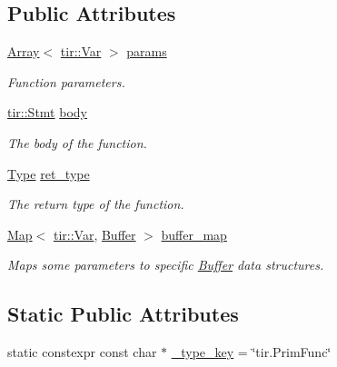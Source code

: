 \subsection*{Public Attributes}
\begin{DoxyCompactItemize}
\item 
\hyperlink{classtvm_1_1Array}{Array}$<$ \hyperlink{classtvm_1_1tir_1_1Var}{tir\+::\+Var} $>$ \hyperlink{classtvm_1_1tir_1_1PrimFuncNode_a4ea77411935e78d975414f31e153fc78}{params}
\begin{DoxyCompactList}\small\item\em Function parameters. \end{DoxyCompactList}\item 
\hyperlink{classtvm_1_1tir_1_1Stmt}{tir\+::\+Stmt} \hyperlink{classtvm_1_1tir_1_1PrimFuncNode_a9fce10a00a4a34c1fa52f7cca25b7e3b}{body}
\begin{DoxyCompactList}\small\item\em The body of the function. \end{DoxyCompactList}\item 
\hyperlink{classtvm_1_1Type}{Type} \hyperlink{classtvm_1_1tir_1_1PrimFuncNode_aa325068615c301abec6656416cab8e09}{ret\+\_\+type}
\begin{DoxyCompactList}\small\item\em The return type of the function. \end{DoxyCompactList}\item 
\hyperlink{classtvm_1_1Map}{Map}$<$ \hyperlink{classtvm_1_1tir_1_1Var}{tir\+::\+Var}, \hyperlink{classtvm_1_1tir_1_1Buffer}{Buffer} $>$ \hyperlink{classtvm_1_1tir_1_1PrimFuncNode_aeb1f162516e09122852496f2a945d100}{buffer\+\_\+map}
\begin{DoxyCompactList}\small\item\em Maps some parameters to specific \hyperlink{classtvm_1_1tir_1_1Buffer}{Buffer} data structures. \end{DoxyCompactList}\end{DoxyCompactItemize}
\subsection*{Static Public Attributes}
\begin{DoxyCompactItemize}
\item 
static constexpr const char $\ast$ \hyperlink{classtvm_1_1tir_1_1PrimFuncNode_a27c7c172dade911d5292dfbfdca033f5}{\+\_\+type\+\_\+key} = \char`\"{}tir.\+Prim\+Func\char`\"{}
\end{DoxyCompactItemize}



